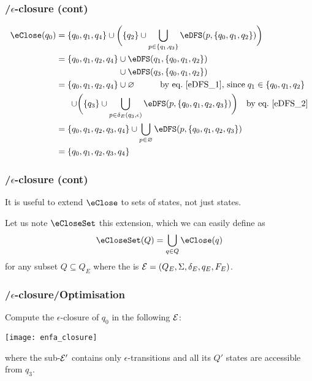 % 
\begin{frame}
\frametitle{\eNFA{}/\(\epsilon\)-closure (cont)}

\begin{align*}
\eClose (q_0)
  &= \{q_0, q_1, q_4\} \cup \biggl(\{q_2\} \cup \bigcup_{p \in
     \{q_1, q_3\}}{\eDFS (p, \{q_0, q_1, q_2\})}\biggr)\\
  &= \{q_0, q_1, q_2, q_4\} \cup \eDFS (q_1, \{q_0, q_1,
     q_2\})\\
  &\mathrel{\phantom{=}} \phantom{\{q_0,q_2,q_2,q_4\}} \cup \eDFS
     (q_3, \{q_0, q_1, q_2\})\\
  &= \{q_0, q_1, q_2, q_4\} \cup \varnothing \qquad\quad
     \text{by eq.~\ref{eDFS_1}, since} \; q_1 \in \{q_0, q_1, q_2\}\\
  &\mathrel{\phantom{=}} \;\,
   \cup \biggl(\{q_3\} \cup \bigcup_{p \in \delta_E(q_3,
     \epsilon)}{\eDFS (p, \{q_0, q_1, q_2, q_3\})}\biggr)
   \quad \text{by eq.~\ref{eDFS_2}}\\
  &= \{q_0, q_1, q_2, q_3, q_4\} \cup \bigcup_{p \in
     \varnothing}{\eDFS (p, \{q_0, q_1, q_2, q_3\})}\\
  &= \{q_0, q_1, q_2, q_3, q_4\}
\end{align*}

\end{frame}

% 
\begin{frame}
\frametitle{\eNFA{}/\(\epsilon\)-closure (cont)}

It is useful to extend \(\eClose\) to sets of states, not just
states. 

\bigskip

Let us note \(\eCloseSet\) this extension, which we can easily
define as
\[
\eCloseSet (Q) = \bigcup_{q \in Q}{\eClose (q)}
\]
for any subset \(Q \subseteq Q_E\) where the \eNFA is \({\cal E} =
(Q_E, \Sigma, \delta_E, q_E, F_E)\).

\end{frame}

% 
\begin{frame}
\frametitle{\eNFA{}/\(\epsilon\)-closure/Optimisation}

\label{enfa_closure}

Compute the \(\epsilon\)-closure of \(q_0\) in the following \eNFA
\(\cal E\):
\begin{center}
\texttt{[image: enfa\_closure]}
\end{center}
where the sub-\eNFA \(\cal E'\) contains only \(\epsilon\)-transitions
and all its \(Q'\) states are accessible from \(q_3\).

\end{frame}

